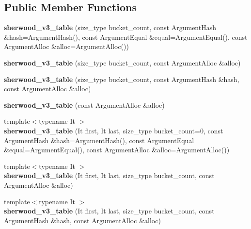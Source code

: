 \subsection*{Public Member Functions}
\begin{DoxyCompactItemize}
\item 
{\bfseries sherwood\+\_\+v3\+\_\+table} (size\+\_\+type bucket\+\_\+count, const Argument\+Hash \&hash=Argument\+Hash(), const Argument\+Equal \&equal=Argument\+Equal(), const Argument\+Alloc \&alloc=Argument\+Alloc())\label{classska_1_1detailv3_1_1sherwood__v3__table_aaa32511bc24a205d8361f0a9ec9dd8d0}

\item 
{\bfseries sherwood\+\_\+v3\+\_\+table} (size\+\_\+type bucket\+\_\+count, const Argument\+Alloc \&alloc)\label{classska_1_1detailv3_1_1sherwood__v3__table_a34f202ef559b7bae86948154c170fe6d}

\item 
{\bfseries sherwood\+\_\+v3\+\_\+table} (size\+\_\+type bucket\+\_\+count, const Argument\+Hash \&hash, const Argument\+Alloc \&alloc)\label{classska_1_1detailv3_1_1sherwood__v3__table_aef224d1aef9b1942b4a89299aee13506}

\item 
{\bfseries sherwood\+\_\+v3\+\_\+table} (const Argument\+Alloc \&alloc)\label{classska_1_1detailv3_1_1sherwood__v3__table_a868295f536ae6050093ef518d59e3213}

\item 
{\footnotesize template$<$typename It $>$ }\\{\bfseries sherwood\+\_\+v3\+\_\+table} (It first, It last, size\+\_\+type bucket\+\_\+count=0, const Argument\+Hash \&hash=Argument\+Hash(), const Argument\+Equal \&equal=Argument\+Equal(), const Argument\+Alloc \&alloc=Argument\+Alloc())\label{classska_1_1detailv3_1_1sherwood__v3__table_acbf66852282c6be341c36de86ca5fd9d}

\item 
{\footnotesize template$<$typename It $>$ }\\{\bfseries sherwood\+\_\+v3\+\_\+table} (It first, It last, size\+\_\+type bucket\+\_\+count, const Argument\+Alloc \&alloc)\label{classska_1_1detailv3_1_1sherwood__v3__table_a81743251db070241f67d26c6490a8f18}

\item 
{\footnotesize template$<$typename It $>$ }\\{\bfseries sherwood\+\_\+v3\+\_\+table} (It first, It last, size\+\_\+type bucket\+\_\+count, const Argument\+Hash \&hash, const Argument\+Alloc \&alloc)\label{classska_1_1detailv3_1_1sherwood__v3__table_a4804a170f10afceacdcaea04f4fd4fce}


\end{DoxyCompactItemize}
